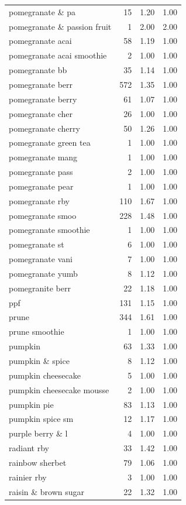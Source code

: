 \begin{table}
\begin{tabular}{lrrr}
pomegranate \& pa & 15 & 1.20 & 1.00 \\
pomegranate \& passion fruit & 1 & 2.00 & 2.00 \\
pomegranate acai & 58 & 1.19 & 1.00 \\
pomegranate acai smoothie & 2 & 1.00 & 1.00 \\
pomegranate bb & 35 & 1.14 & 1.00 \\
pomegranate berr & 572 & 1.35 & 1.00 \\
pomegranate berry & 61 & 1.07 & 1.00 \\
pomegranate cher & 26 & 1.00 & 1.00 \\
pomegranate cherry & 50 & 1.26 & 1.00 \\
pomegranate green tea & 1 & 1.00 & 1.00 \\
pomegranate mang & 1 & 1.00 & 1.00 \\
pomegranate pass & 2 & 1.00 & 1.00 \\
pomegranate pear & 1 & 1.00 & 1.00 \\
pomegranate rby & 110 & 1.67 & 1.00 \\
pomegranate smoo & 228 & 1.48 & 1.00 \\
pomegranate smoothie & 1 & 1.00 & 1.00 \\
pomegranate st & 6 & 1.00 & 1.00 \\
pomegranate vani & 7 & 1.00 & 1.00 \\
pomegranate yumb & 8 & 1.12 & 1.00 \\
pomegranite berr & 22 & 1.18 & 1.00 \\
ppf & 131 & 1.15 & 1.00 \\
prune & 344 & 1.61 & 1.00 \\
prune smoothie & 1 & 1.00 & 1.00 \\
pumpkin & 63 & 1.33 & 1.00 \\
pumpkin \& spice & 8 & 1.12 & 1.00 \\
pumpkin cheesecake & 5 & 1.00 & 1.00 \\
pumpkin cheesecake mousse & 2 & 1.00 & 1.00 \\
pumpkin pie & 83 & 1.13 & 1.00 \\
pumpkin spice sm & 12 & 1.17 & 1.00 \\
purple berry \& l & 4 & 1.00 & 1.00 \\
radiant rby & 33 & 1.42 & 1.00 \\
rainbow sherbet & 79 & 1.06 & 1.00 \\
rainier rby & 3 & 1.00 & 1.00 \\
raisin \& brown sugar & 22 & 1.32 & 1.00 \\

\end{tabular}
\end{table}
